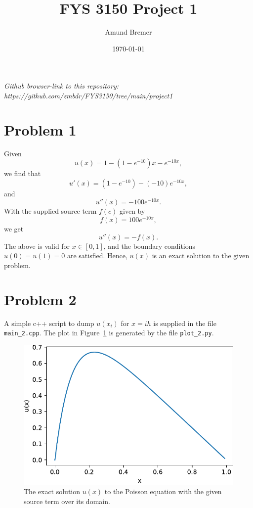 \documentclass[english,notitlepage]{revtex4}  %
\begin{document}
\title{FYS 3150 Project 1}      %
\author{Amund Bremer}          %
\date{\today}                             %

\noaffiliation                            %


\maketitle   
\textit{Github browser-link to this repository: https://github.com/zmbdr/FYS3150/tree/main/project1}
    
\section*{Problem 1}
Given
\begin{equation*}
    u(x) = 1 - (1 - e^{-10}) x - e^{-10 x},
\end{equation*}
we find that
\begin{equation*}
    u'(x) = (1 - e^{-10})  - (-10) e^{-10 x},
\end{equation*}
and
\begin{equation*}
    u''(x) =  -100 e^{-10 x}.
\end{equation*}
With the supplied source term $f(c)$ given by
\begin{equation*}
    f(x) = 100  e^{-10 x},
\end{equation*}
we get 
\begin{equation*}
    u''(x) =  -f(x).
\end{equation*}
The above is valid for $x \in [0, 1]$, and the boundary conditions $u(0) = u(1) = 0$ are satisfied. Hence, $u(x)$ is an 
exact solution to the given problem.
%
\section*{Problem 2}
A simple c++ script to dump $u(x_i)$ for $x = ih$ is supplied in the file \texttt{main\_2.cpp}. 
The plot in Figure~\ref{fig:exact} is generated  by the file \texttt{plot\_2.py}. 

\begin{figure}%
    \centering %
    \includegraphics{figs/problem_2.pdf} %
    \caption{The exact solution $u(x)$ to the Poisson equation with the given source term over its domain.}
    \label{fig:exact}
\end{figure}
%
\end{document}
